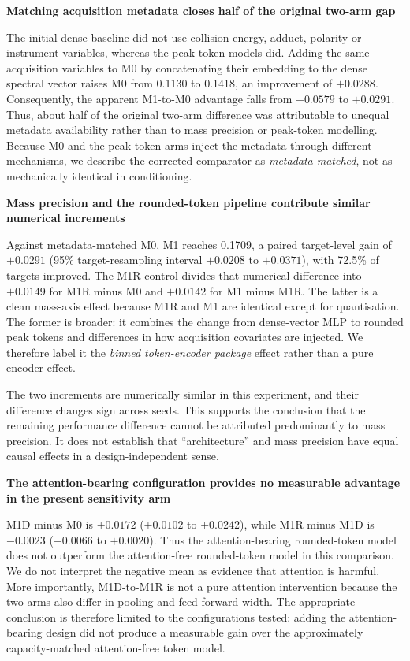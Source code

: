 \documentclass[11pt]{article}
\newcommand{\hd}[1]{\medskip\par\noindent\textbf{#1}\par\nobreak\vspace{2pt}\noindent\ignorespaces}
\begin{document}
\hd{Matching acquisition metadata closes half of the original two-arm gap}
The initial dense baseline did not use collision energy, adduct, polarity or instrument variables, whereas the peak-token models did. Adding the same acquisition variables to M0 by concatenating their embedding to the dense spectral vector raises M0 from 0.1130 to 0.1418, an improvement of $+0.0288$. Consequently, the apparent M1-to-M0 advantage falls from $+0.0579$ to $+0.0291$. Thus, about half of the original two-arm difference was attributable to unequal metadata availability rather than to mass precision or peak-token modelling. Because M0 and the peak-token arms inject the metadata through different mechanisms, we describe the corrected comparator as \emph{metadata matched}, not as mechanically identical in conditioning.

\hd{Mass precision and the rounded-token pipeline contribute similar numerical increments}
Against metadata-matched M0, M1 reaches 0.1709, a paired target-level gain of $+0.0291$ (95\% target-resampling interval $+0.0208$ to $+0.0371$), with 72.5\% of targets improved. The M1R control divides that numerical difference into $+0.0149$ for M1R minus M0 and $+0.0142$ for M1 minus M1R. The latter is a clean mass-axis effect because M1R and M1 are identical except for quantisation. The former is broader: it combines the change from dense-vector MLP to rounded peak tokens and differences in how acquisition covariates are injected. We therefore label it the \emph{binned token-encoder package} effect rather than a pure encoder effect.

The two increments are numerically similar in this experiment, and their difference changes sign across seeds. This supports the conclusion that the remaining performance difference cannot be attributed predominantly to mass precision. It does not establish that ``architecture'' and mass precision have equal causal effects in a design-independent sense.

\hd{The attention-bearing configuration provides no measurable advantage in the present sensitivity arm}
M1D minus M0 is $+0.0172$ ($+0.0102$ to $+0.0242$), while M1R minus M1D is $-0.0023$ ($-0.0066$ to $+0.0020$). Thus the attention-bearing rounded-token model does not outperform the attention-free rounded-token model in this comparison. We do not interpret the negative mean as evidence that attention is harmful. More importantly, M1D-to-M1R is not a pure attention intervention because the two arms also differ in pooling and feed-forward width. The appropriate conclusion is therefore limited to the configurations tested: adding the attention-bearing design did not produce a measurable gain over the approximately capacity-matched attention-free token model.
\end{document}
